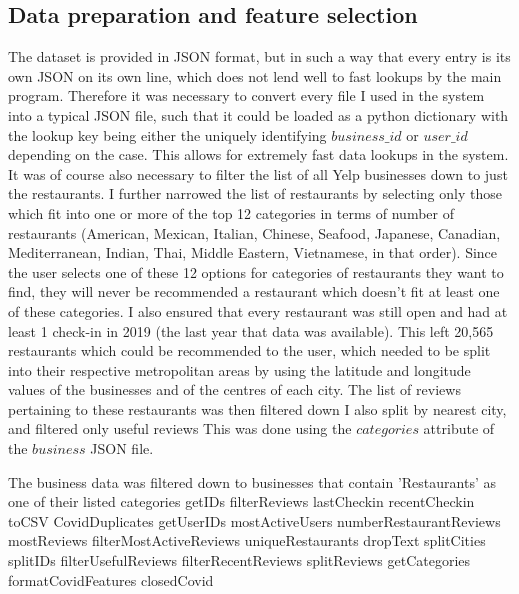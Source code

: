 \documentclass[conference]{IEEEtran}
\begin{document}
\subsection{Data preparation and feature selection}
The dataset is provided in JSON format, but in such a way that every entry is its own JSON on its own line, 
which does not lend well to fast lookups by the main program. 
Therefore it was necessary to convert every file I used in the system into a typical JSON file, such that it could 
be loaded as a python dictionary with the lookup key being either the uniquely identifying $business\_id$ or 
$user\_id$ depending on the case. 
This allows for extremely fast data lookups in the system. 
It was of course also necessary to filter the list of all Yelp businesses down to just the restaurants. 
I further narrowed the list of restaurants by selecting only those which fit into one or more of the top 12 
categories in terms of number of restaurants (American, Mexican, Italian, Chinese, Seafood, Japanese, Canadian, 
Mediterranean, Indian, Thai, Middle Eastern, Vietnamese, in that order). 
Since the user selects one of these 12 options for categories of restaurants they want to find, they will 
never be recommended a restaurant which doesn't fit at least one of these categories. 
I also ensured that every restaurant was still open and had at least 1 check-in in 2019 (the last year that 
data was available). 
This left 20,565 restaurants which could be recommended to the user, which needed to be split into their respective 
metropolitan areas by using the latitude and longitude values of the businesses and of the centres of each city. 
The list of reviews pertaining to these restaurants was then filtered down
I also split by nearest city, and filtered only useful reviews
This was done using the $categories$ attribute of the $business$ JSON file. 

The business data was filtered down to businesses that contain 'Restaurants' as one of their listed 
categories
getIDs
filterReviews
lastCheckin
recentCheckin
toCSV
CovidDuplicates
getUserIDs
mostActiveUsers
numberRestaurantReviews
mostReviews
filterMostActiveReviews
uniqueRestaurants
dropText
splitCities
splitIDs
filterUsefulReviews
filterRecentReviews
splitReviews
getCategories
formatCovidFeatures
closedCovid
\end{document}
